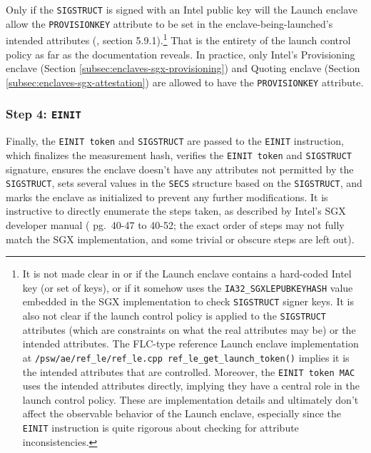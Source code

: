 Only if the {\tt SIGSTRUCT} is signed with an Intel public key will the Launch enclave allow the {\tt PROVISIONKEY} attribute to be set in the enclave-being-launched's intended attributes (\cite{sgx-reference-launch-enclave}, \cite{intel-sgx-explained-advanced} section 5.9.1).\footnote{It is not made clear in \cite{intel-sgx-explained-advanced} or \cite{sgx-manual} if the Launch enclave contains a hard-coded Intel key (or set of keys), or if it somehow uses the {\tt IA32\_SGXLEPUBKEYHASH} value embedded in the SGX implementation to check {\tt SIGSTRUCT} signer keys. It is also not clear if the launch control policy is applied to the {\tt SIGSTRUCT} attributes (which are constraints on what the real attributes may be) or the intended attributes. The FLC-type reference Launch enclave implementation at \cite{intel-lib-linux-sgx} {\tt /psw/ae/ref\_le/ref\_le.cpp ref\_le\_get\_launch\_token()} implies it is the intended attributes that are controlled. Moreover, the {\tt EINIT token MAC} uses the intended attributes directly, implying they have a central role in the launch control policy. These are implementation details and ultimately don't affect the observable behavior of the Launch enclave, especially since the {\tt EINIT} instruction is quite rigorous about checking for attribute inconsistencies.} That is the entirety of the launch control policy as far as the documentation reveals. In practice, only Intel's Provisioning enclave (Section \ref{subsec:enclaves-sgx-provisioning}) and Quoting enclave (Section \ref{subsec:enclaves-sgx-attestation}) are allowed to have the {\tt PROVISIONKEY} attribute.

\subsubsection{Step 4: {\tt EINIT}}

Finally, the {\tt EINIT token} and {\tt SIGSTRUCT} are passed to the {\tt EINIT} instruction, which finalizes the measurement hash, verifies the {\tt EINIT token} and {\tt SIGSTRUCT} signature, ensures the enclave doesn't have any attributes not permitted by the {\tt SIGSTRUCT}, sets several values in the {\tt SECS} structure based on the {\tt SIGSTRUCT}, and marks the enclave as initialized to prevent any further modifications. It is instructive to directly enumerate the steps taken, as described by Intel's SGX developer manual (\cite{sgx-manual} pg.\ 40-47 to 40-52; the exact order of steps may not fully match the SGX implementation, and some trivial or obscure steps are left out).

